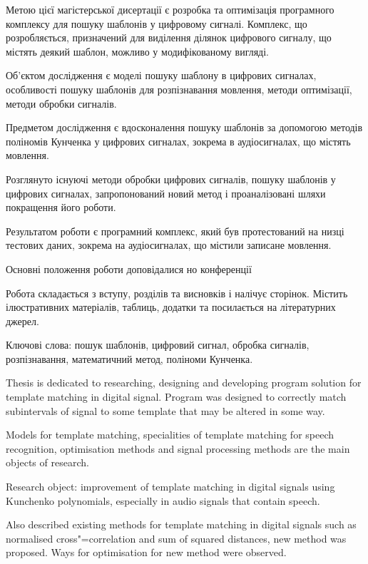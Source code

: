 Метою цієї магістерської дисертації є розробка та оптимізація програмного комплексу для пошуку шаблонів у цифровому
сигналі.
Комплекс, що розробляється, призначений для виділення ділянок цифрового сигналу, що містять деякий шаблон, можливо у
модифікованому вигляді.

Об’єктом дослідження є моделі пошуку шаблону в цифрових сигналах, особливості пошуку шаблонів для розпізнавання
мовлення, методи оптимізації, методи обробки сигналів.

Предметом дослідження є вдосконалення пошуку шаблонів за допомогою методів поліномів Кунченка у цифрових сигналах,
зокрема в аудіосигналах, що містять мовлення.

Розглянуто існуючі методи обробки цифрових сигналів, пошуку шаблонів у цифрових сигналах, запропонований новий метод і
проаналізовані шляхи покращення його роботи.

Результатом роботи є програмний комплекс, який був протестований на низці тестових даних, зокрема на аудіосигналах, що
містили записане мовлення.

Основні положення роботи доповідалися но конференції 

Робота складається з вступу,   розділів та висновків і налічує  сторінок.
Містить  ілюстративних матеріалів,  таблиць,  додатки та
посилається на  літературних джерел.

Ключові слова: пошук шаблонів, цифровий сигнал, обробка сигналів, розпізнавання, математичний метод, поліноми
Кунченка.
\clearpage

Thesis is dedicated to researching, designing and developing program solution for template matching in digital signal.
Program was designed to correctly match subintervals of signal to some template that may be altered in some way.

Models for template matching, specialities of template matching for speech recognition, optimisation methods and
signal processing methods are the main objects of research.

Research object: improvement of template matching in digital signals using Kunchenko polynomials, especially in
audio signals that contain speech.

Also described existing methods for template matching in digital signals such as normalised cross"=correlation and sum
of squared distances, new method was proposed.
Ways for optimisation for new method were observed.

